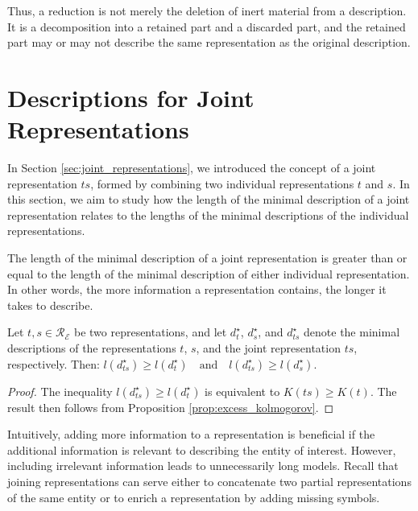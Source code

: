 Thus, a reduction is not merely the deletion of inert material from a description. It is a decomposition into a retained part and a discarded part, and the retained part may or may not describe the same representation as the original description.

%
%

\section{Descriptions for Joint Representations}
\label{sec:description_joint_represenation}

In Section \ref{sec:joint_representations}, we introduced the concept of a joint representation $ts$, formed by combining two individual representations $t$ and $s$. In this section, we aim to study how the length of the minimal description of a joint representation relates to the lengths of the minimal descriptions of the individual representations.

The length of the minimal description of a joint representation is greater than or equal to the length of the minimal description of either individual representation. In other words, the more information a representation contains, the longer it takes to describe.

\begin{proposition}
\label{prop:joint_length}
Let $t,s \in \mathcal{R}_\mathcal{E}$ be two representations, and let $d_{t}^{\star}$, $d_{s}^{\star}$, and $d_{ts}^{\star}$ denote the minimal descriptions of the representations $t$, $s$, and the joint representation $ts$, respectively. Then: $l \left( d_{ts}^{\star} \right) \geq l \left( d_{t}^{\star} \right) \quad \text{and} \quad l \left( d_{ts}^{\star} \right) \geq l \left( d_{s}^{\star} \right).$
\end{proposition}
\begin{proof}
The inequality $l \left( d_{ts}^{\star} \right) \geq l \left( d_{t}^{\star} \right)$ is equivalent to $K(ts) \geq K(t)$. The result then follows from Proposition \ref{prop:excess_kolmogorov}.
\end{proof}

Intuitively, adding more information to a representation is beneficial if the additional information is relevant to describing the entity of interest. However, including irrelevant information leads to unnecessarily long models. Recall that joining representations can serve either to concatenate two partial representations of the same entity or to enrich a representation by adding missing symbols.

